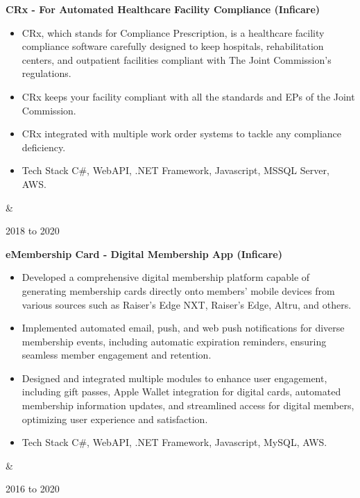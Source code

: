 \documentclass[10pt, letterpaper]{article}
\newenvironment{highlights}{
        \begin{itemize}[
                topsep=0pt,
                parsep=0.10 cm,
                partopsep=0pt,
                itemsep=0pt,
                after=\vspace{-1\baselineskip},
                leftmargin=0.4 cm + 3pt
            ]
    }{
        \end{itemize}
    } %
\let\originalTabularx\tabularx
\let\originalEndTabularx\endtabularx
\renewenvironment{tabularx}{\bgroup\centering\originalTabularx}{\originalEndTabularx\par\egroup}
\begin{document}
        \vspace{0.2 cm}
        \begin{tabularx}{
            \textwidth-0.4 cm-0.13cm
        }{
            K{0.2 cm}
            R{4.1 cm}
        }
            \textbf{CRx - For Automated Healthcare Facility Compliance (Inficare)}

            \vspace{0.10 cm}

            \begin{highlights}
                \item CRx, which stands for Compliance Prescription, is a healthcare facility compliance software carefully designed to keep hospitals, rehabilitation centers, and outpatient facilities compliant with The Joint Commission's regulations.
                \item CRx keeps your facility compliant with all the standards and EPs of the Joint Commission.
                \item CRx integrated with multiple work order systems to tackle any compliance deficiency.
                \item Tech Stack C\#, WebAPI, .NET Framework, Javascript, MSSQL Server, AWS.
            \end{highlights}
            &
            

            2018 to 2020
        \end{tabularx}


        \vspace{0.2 cm}
        \begin{tabularx}{
            \textwidth-0.4 cm-0.13cm
        }{
            K{0.2 cm}
            R{4.1 cm}
        }
            \textbf{eMembership Card - Digital Membership App (Inficare)}

            \vspace{0.10 cm}

            \begin{highlights}
                \item Developed a comprehensive digital membership platform capable of generating membership cards directly onto members' mobile devices from various sources such as Raiser's Edge NXT, Raiser's Edge, Altru, and others.
                \item Implemented automated email, push, and web push notifications for diverse membership events, including automatic expiration reminders, ensuring seamless member engagement and retention.
                \item Designed and integrated multiple modules to enhance user engagement, including gift passes, Apple Wallet integration for digital cards, automated membership information updates, and streamlined access for digital members, optimizing user experience and satisfaction.
                \item Tech Stack C\#, WebAPI, .NET Framework, Javascript, MySQL, AWS.
            \end{highlights}
            &
            

            2016 to 2020
        \end{tabularx}
\end{document}
